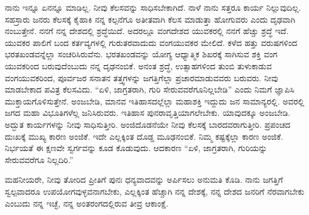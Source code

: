 ನಾನು ಇನ್ನೂ ಏನನ್ನೂ ಮಾಡಿಲ್ಲ. ನೀವು ಕೆಲಸವನ್ನು ಸಾಧಿಸಬೇಕಾಗಿದೆ. ನಾಳೆ ನಾನು ಸತ್ತರೂ ಕಾರ್ಯ ನಿಲ್ಲುವುದಿಲ್ಲ. ಸಹಸ್ರಾರು ಜನರು ಕೆಲಸಕ್ಕೆ ಕೈಹಾಕಿ ನನ್ನ ಕಲ್ಪನೆಗೂ ಅತೀತವಾಗಿ ಕೆಲಸ ಮಾಡುತ್ತಾ ಹೋಗುವರು ಎಂದು ದೃಢವಾಗಿ ನಂಬುತ್ತೇನೆ. ನನಗೆ ನನ್ನ ದೇಶದಲ್ಲಿ ಶ್ರದ್ಧೆಯಿದೆ. ಅದರಲ್ಲೂ ವಂಗದೇಶದ ಯುವಕರಲ್ಲಿ ನನಗೆ ಹೆಚ್ಚು ಶ್ರದ್ಧೆ ಇದೆ. ಯುವಕರ ಪಾಲಿಗೆ ಬಂದ ಕರ್ತವ್ಯಗಳಲ್ಲಿ ಗುರುತರವಾದುದು ವಂಗಯುವಕರ ಮೇಲಿದೆ. ಕಳೆದ ಹತ್ತು ವರುಷಗಳಿಂದ ಭರತಖಂಡವನ್ನೆಲ್ಲಾ ಸಂಚರಿಸಿರುವೆನು. ಭರತಖಂಡವನ್ನು ಯೋಗ್ಯ ಆಧ್ಯಾತ್ಮಿಕ ಶಿಖರಕ್ಕೆ ಸಾಗಿಸುವ ಶಕ್ತಿ ವಂಗ ಯುವಕರಿಂದ ಬರುವುದೆಂಬುದು ನನ್ನ ದೃಢನಂಬಿಕೆ. ಅನಂತ ಶ್ರದ್ಧೆ, ಉತ್ಸಾಹಗಳಿಂದ ತುಂಬಿ ತುಳುಕಾಡುವ ವಂಗಯುವಕರಿಂದ, ಪೂರ್ವಜರ ಸನಾತನ ತತ್ತ್ವಗಳನ್ನು ಜಗತ್ತಿಗೆಲ್ಲಾ ಪ್ರಚಾರಮಾಡುವವರು ಬರುವರು. ನೀವು ಮಾಡಬೇಕಾದ ಪವಿತ್ರ ಕೆಲಸವಿದು. “ಏಳಿ, ಜಾಗ್ರತರಾಗಿ, ಗುರಿ ಸೇರುವವರೆಗೂ\break ನಿಲ್ಲಬೇಡಿ” ಎಂದು ನಿಮಗೆ ಜ್ಞಾಪಿಸಿ ಮುಕ್ತಾಯಗೊಳಿಸುತ್ತೇನೆ. ಅಂಜಬೇಡಿ, ಮಾನವ ಇತಿಹಾಸದಲ್ಲೆಲ್ಲಾ ಮಹಾಶಕ್ತಿ ಇದ್ದುದು ಜನ ಸಾಮಾನ್ಯರಲ್ಲಿ. ಅವರಲ್ಲಿ ಜಗದ ಮಹಾ ವಿಭೂತಿಗಳೆಲ್ಲ ಜನಿಸಿರುವರು. ಇತಿಹಾಸ ಪುನರಾವೃತ್ತಿಯಾಗಲೇಬೇಕು. ಯಾವುದಕ್ಕೂ ಅಂಜಬೇಡಿ. ಅದ್ಭುತ ಕಾರ್ಯಗಳನ್ನು ನೀವು ಸಾಧಿಸುತ್ತೀರಿ. ಅಂಜಿದೊಡನೆಯೇ ನೀವು ಕೆಲಸಕ್ಕೆ ಬಾರದವರಾಗುತ್ತೀರಿ. ಪ್ರಪಂಚದ ದುಃಖಕ್ಕೆ ಮುಖ್ಯ ಕಾರಣ ಅಂಜಿಕೆ. ಇದೇ ಎಲ್ಲಕ್ಕಿಂತ ದೊಡ್ಡ ಮೂಢನಂಬಿಕೆ. ನಿಮ್ಮ ಕಷ್ಟಕ್ಕೆಲ್ಲಾ ಕಾರಣ ಅಂಜಿಕೆ. ನಿರ್ಭಯತೆ ಈ ಕ್ಷಣವೇ ಸ್ವರ್ಗವನ್ನು ಕೂಡ ಕೊಡುವುದು. ಆದಕಾರಣ “ಏಳಿ, ಜಾಗ್ರತರಾಗಿ, ಗುರಿಯನ್ನು ಸೇರುವವರೆಗೂ ನಿಲ್ಲದಿರಿ.”

\vskip   4pt

ಮಹನೀಯರೇ, ನೀವು ತೋರಿದ ಪ್ರೀತಿಗೆ ಪುನಃ ಧನ್ಯವಾದವನ್ನು ಅರ್ಪಿಸಲು ಅನುಮತಿ ಕೊಡಿ. ನಾನು ಜಗತ್ತಿಗೆ ಸ್ವಲ್ಪವಾದರೂ ಉಪಯೋಗವುಳ್ಳವನಾಗಬೇಕು, ಎಲ್ಲಕ್ಕಿಂತ ಹೆಚ್ಚಾಗಿ ನನ್ನ ದೇಶಕ್ಕೆ, ನನ್ನ ದೇಶದ ಜನರಿಗೆ ನೆರವಾಗಬೇಕು ಎಂಬುದು ನನ್ನ ಇಚ್ಛೆ, ನನ್ನ ಅಂತರಂಗದಲ್ಲಿರುವ ತೀವ್ರ ಆಕಾಂಕ್ಷೆ.

